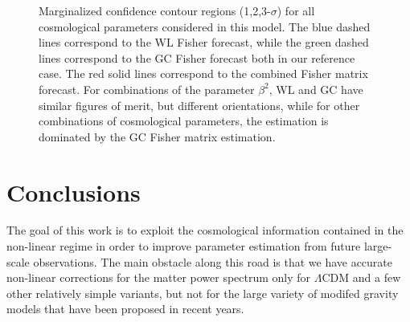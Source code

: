 \begin{figure}
%
\centering{}
\caption[Fisher confidence regions for GC and WL in the CDE model.]{\label{fig:Contour-regions} Marginalized confidence contour regions
(1,2,3-$\sigma$) for all cosmological parameters considered in this
model. The blue dashed lines correspond to the WL Fisher forecast,
while the green dashed lines correspond to the GC Fisher forecast
both in our reference case. The red solid lines correspond to the
combined Fisher matrix forecast. For combinations of the parameter
$\beta^{2}$, WL and GC have similar figures of merit, but different
orientations, while for other combinations of cosmological parameters,
the estimation is dominated by the GC Fisher matrix estimation.}
\end{figure}



\section{Conclusions}

\done{} 
The goal of this work is to exploit the cosmological information
contained in the non-linear regime in order to improve parameter estimation
from future large-scale observations. The main obstacle along this
road is that we have accurate non-linear corrections for the matter
power spectrum only for $\Lambda$CDM and a few other relatively simple
variants, but not for the large variety of modifed gravity models
that have been proposed in recent years.

